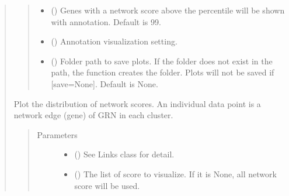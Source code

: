 \documentclass[letterpaper,10pt,english]{sphinxmanual}
\begin{document}
\begin{quote}
\begin{fulllineitems}
\begin{fulllineitems}
\begin{quote}
\begin{description}
\begin{itemize}
\item {} 
 () \textendash{} Genes with a network score above the percentile will be shown with annotation. Default is 99.

\item {} 
 (\sphinxstyleliteralemphasis{\sphinxupquote{(}}\sphinxstyleliteralemphasis{\sphinxupquote{, }}\sphinxstyleliteralemphasis{\sphinxupquote{)}}) \textendash{} Annotation visualization setting.

\item {} 
 () \textendash{} Folder path to save plots. If the folder does not exist in the path, the function creates the folder.
Plots will not be saved if {[}save=None{]}. Default is None.

\end{itemize}

\end{description}\end{quote}

\end{fulllineitems}


\begin{fulllineitems}
\label{\detokenize{modules/celloracle.network_analysis:celloracle.network_analysis.Links.plot_score_discributions}}
Plot the distribution of network scores.
An individual data point is a network edge (gene) of GRN in each cluster.
\begin{quote}\begin{description}
\item[{Parameters}] \leavevmode\begin{itemize}
\item {} 
 ({\hyperref[\detokenize{modules/celloracle:celloracle.Links}]{}}) \textendash{} See Links class for detail.

\item {} 
 () \textendash{} The list of score to visualize. If it is None, all network score will be used.


\end{itemize}
\end{description}
\end{quote}
\end{fulllineitems}
\end{fulllineitems}
\end{quote}
\end{document}
